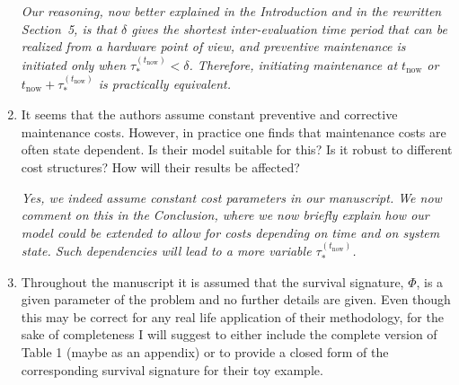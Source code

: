 \documentclass[authoryear]{elsarticle}
\def\tnow{t_\text{now}}
\newcommand{\tausnow}{\tau_*^{(\tnow)}}
\begin{document}
\begin{enumerate}
\smallskip

\emph{Our reasoning, now better explained in the Introduction and in the rewritten Section~5,
is that $\delta$ gives the shortest inter-evaluation time period that can be realized from a hardware point of view,
and preventive maintenance is initiated only when $\tausnow < \delta$.
Therefore, initiating maintenance at $\tnow$ or $\tnow + \tausnow$ is practically equivalent.}

\item It seems that the authors assume constant preventive and corrective maintenance costs. However, in practice one finds that maintenance costs are often state dependent. Is their model suitable for this? Is it robust to different cost structures? How will their results be affected?

\smallskip

\emph{Yes, we indeed assume constant cost parameters in our manuscript.
We now comment on this in the Conclusion, where we now briefly explain how our model could be extended to allow
for costs depending on time and on system state.
Such dependencies will lead to a more variable $\tausnow$.}

\item Throughout the manuscript it is assumed that the survival signature, $\Phi$, is a given parameter of the problem and no further details are given. Even though this may be correct for any real life application of their methodology, for the sake of completeness I will suggest to either include the complete version of Table 1 (maybe as an appendix) or to provide a closed form of the corresponding survival signature for their toy example.

\smallskip


\end{enumerate}
\end{document}
